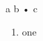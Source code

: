 \documentclass{article}
\edef\y{\noexpand•}
\begin{document}
a \x{} b \y{} c
\begin{enumerate}
\item one
\end{enumerate}
\end{document}
